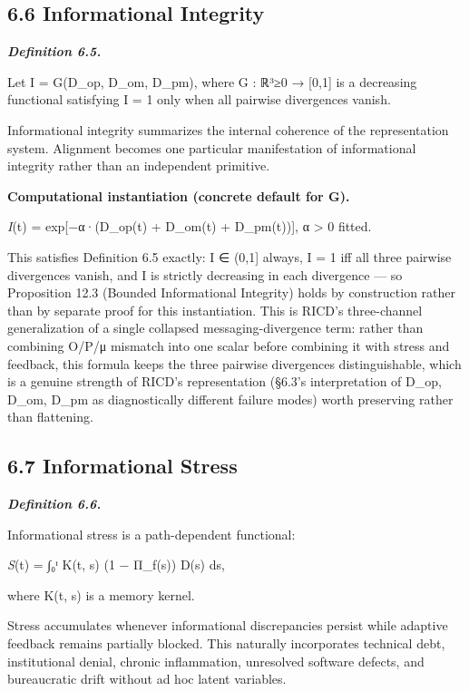 \documentclass[
]{article}
\begin{document}
\hypertarget{informational-integrity}{%
\subsection{6.6 Informational Integrity}\label{informational-integrity}}

\emph{\textbf{Definition 6.5.}}

Let I = G(D\_op, D\_om, D\_pm), where G : ℝ³≥0 → {[}0,1{]} is a
decreasing functional satisfying I = 1 only when all pairwise
divergences vanish.

Informational integrity summarizes the internal coherence of the
representation system. Alignment becomes one particular manifestation of
informational integrity rather than an independent primitive.

\textbf{Computational instantiation (concrete default for G).}

\emph{I}(t) = exp{[}−α·(D\_op(t) + D\_om(t) + D\_pm(t)){]}, α
\textgreater{} 0 fitted.

This satisfies Definition 6.5 exactly: I ∈ (0,1{]} always, I = 1 iff all
three pairwise divergences vanish, and I is strictly decreasing in each
divergence --- so Proposition 12.3 (Bounded Informational Integrity)
holds by construction rather than by separate proof for this
instantiation. This is RICD's three-channel generalization of a single
collapsed messaging-divergence term: rather than combining O/P/μ
mismatch into one scalar before combining it with stress and feedback,
this formula keeps the three pairwise divergences distinguishable, which
is a genuine strength of RICD's representation (§6.3's interpretation of
D\_op, D\_om, D\_pm as diagnostically different failure modes) worth
preserving rather than flattening.

\hypertarget{informational-stress}{%
\subsection{6.7 Informational Stress}\label{informational-stress}}

\emph{\textbf{Definition 6.6.}}

Informational stress is a path-dependent functional:

\emph{S}(t) = ∫₀ᵗ K(t, s) (1 − Π\_f(s)) D(s) ds,

where K(t, s) is a memory kernel.

Stress accumulates whenever informational discrepancies persist while
adaptive feedback remains partially blocked. This naturally incorporates
technical debt, institutional denial, chronic inflammation, unresolved
software defects, and bureaucratic drift without ad hoc latent
variables.
\end{document}
